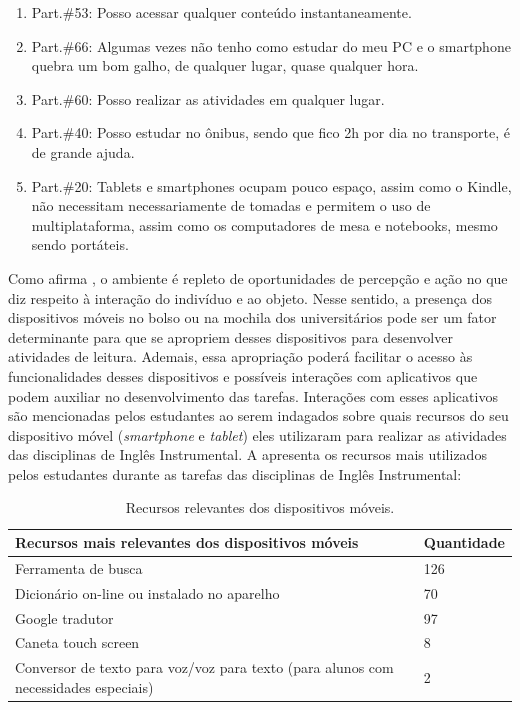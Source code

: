 \documentclass[portuguese]{textolivre}
\begin{document}
\begin{enumerate}[resume]
    \item\label{ex12} Part.\#53: Posso acessar qualquer conteúdo instantaneamente.

    \item\label{ex13} Part.\#66: Algumas vezes não tenho como estudar do meu PC e o smartphone quebra um bom galho, de qualquer lugar, quase qualquer hora.

    \item\label{ex14} Part.\#60: Posso realizar as atividades em qualquer lugar.

    \item\label{ex15} Part.\#40: Posso estudar no ônibus, sendo que fico 2h por dia no transporte, é de grande ajuda.

    \item Part.\#20: Tablets e smartphones ocupam pouco espaço, assim como o Kindle, não necessitam necessariamente de tomadas e permitem o uso de multiplataforma, assim como os computadores de mesa e notebooks, mesmo sendo portáteis.
\end{enumerate}

Como afirma \textcite{gibson1977theory}, o ambiente é repleto de oportunidades de percepção e ação no que diz respeito à interação do indivíduo e ao objeto. Nesse sentido, a presença dos dispositivos móveis no bolso ou na mochila dos universitários pode ser um fator determinante para que se apropriem desses dispositivos para desenvolver atividades de leitura. Ademais, essa apropriação poderá facilitar o acesso às funcionalidades desses dispositivos e possíveis interações com aplicativos que podem auxiliar no desenvolvimento das tarefas. Interações com esses aplicativos são mencionadas pelos estudantes ao serem indagados sobre quais recursos do seu dispositivo móvel (\emph{smartphone} e \emph{tablet}) eles utilizaram para realizar as atividades das disciplinas de Inglês Instrumental. A  apresenta os recursos mais utilizados pelos estudantes durante as tarefas das disciplinas de Inglês Instrumental:


\begin{table}[h!]
\centering
\begin{threeparttable}
\caption{Recursos relevantes dos dispositivos móveis.}
\label{tab01}
\begin{tabular}{ll}
\toprule
Recursos mais relevantes dos dispositivos móveis & Quantidade \\
\midrule
Ferramenta de busca & 126 \\
Dicionário on-line ou instalado no aparelho & 70 \\
Google 	tradutor & 97 \\
Caneta 	touch screen & 8 \\
\multicolumn{1}{p{8cm}}{Conversor de texto para voz/voz para texto (para alunos com necessidades especiais)} & 2 \\
\bottomrule
\end{tabular}
\end{threeparttable}
\end{table}
\end{document}
